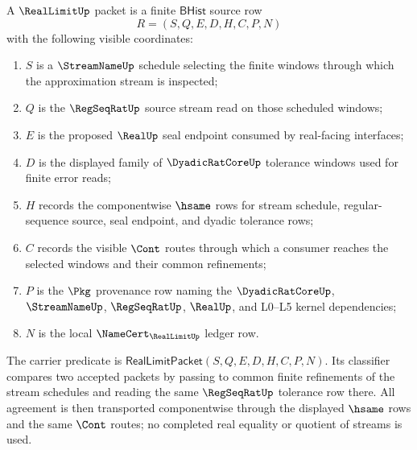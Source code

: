 \begin{definition}
\label{def:reallimit-bhist-carrier}
A $\RealLimitUp$ packet is a finite $\mathsf{BHist}$ source row
$$
R=(S,Q,E,D,H,C,P,N)
$$
with the following visible coordinates:
\begin{enumerate}
\item $S$ is a $\StreamNameUp$ schedule selecting the finite windows through
which the approximation stream is inspected;
\item $Q$ is the $\RegSeqRatUp$ source stream read on those scheduled windows;
\item $E$ is the proposed $\RealUp$ seal endpoint consumed by real-facing
interfaces;
\item $D$ is the displayed family of $\DyadicRatCoreUp$ tolerance windows used
for finite error reads;
\item $H$ records the componentwise $\hsame$ rows for stream schedule,
regular-sequence source, seal endpoint, and dyadic tolerance rows;
\item $C$ records the visible $\Cont$ routes through which a consumer reaches
the selected windows and their common refinements;
\item $P$ is the $\Pkg$ provenance row naming the $\DyadicRatCoreUp$,
$\StreamNameUp$, $\RegSeqRatUp$, $\RealUp$, and L0--L5 kernel dependencies;
\item $N$ is the local $\NameCert_{\RealLimitUp}$ ledger row.
\end{enumerate}
The carrier predicate is
$\mathsf{RealLimitPacket}(S,Q,E,D,H,C,P,N)$. Its classifier compares two
accepted packets by passing to common finite refinements of the stream schedules
and reading the same $\RegSeqRatUp$ tolerance row there. All agreement is then
transported componentwise through the displayed $\hsame$ rows and the same
$\Cont$ routes; no completed real equality or quotient of streams is used.
\end{definition}

